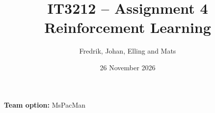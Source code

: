 \documentclass[a4paper,11pt]{article}
\title{IT3212 -- Assignment 4\\Reinforcement Learning}
\author{Fredrik, Johan, Elling and Mats}
\date{26 November 2026}
\begin{document}
\maketitle
\noindent\textbf{Team option:} MsPacMan










\clearpage

\end{document}
